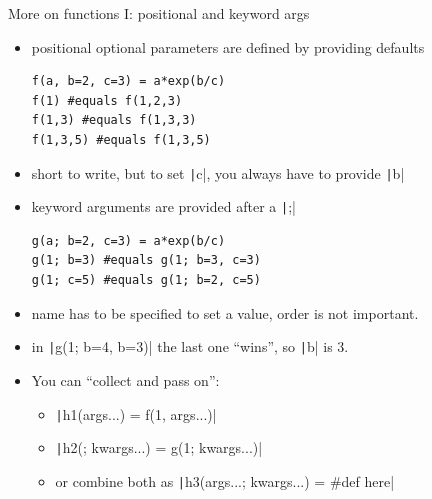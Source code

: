 \documentclass[aspectratio=169, 12pt]{beamer}
\begin{document}
    \begin{frame}[fragile]{More on functions I: positional and keyword args}
        \begin{itemize}
            \item \alert{positional optional} parameters are defined by providing defaults
        \begin{verbatim}
f(a, b=2, c=3) = a*exp(b/c)
f(1) #equals f(1,2,3)
f(1,3) #equals f(1,3,3)
f(1,3,5) #equals f(1,3,5)
        \end{verbatim}
        \item short to write, \alert{but} to set \texttt|c|, you always have to provide \texttt|b|
            \pause
            \item \alert{keyword arguments} are provided after a \texttt|;|
        \begin{verbatim}
g(a; b=2, c=3) = a*exp(b/c)
g(1; b=3) #equals g(1; b=3, c=3)
g(1; c=5) #equals g(1; b=2, c=5)
        \end{verbatim}
            \item name has to be specified to set a value, order is \alert{not} important.
            \pause
            \item in \texttt|g(1; b=4, b=3)| the last one “wins”, so \texttt|b| is 3.
            \pause
        \item You can “collect and pass on”:
            \begin{itemize}
                \item \texttt|h1(args...) = f(1, args...)|
                \item \texttt|h2(; kwargs...) = g(1; kwargs...)|
                \item or combine both as \texttt|h3(args...; kwargs...) = #def here|
            \end{itemize}
        \end{itemize}
    \end{frame}
\end{document}
